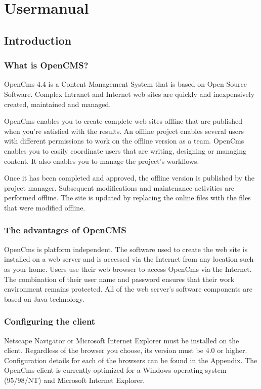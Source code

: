 \chapter{Usermanual}

\section{Introduction}

\subsection{What is OpenCMS?}

OpenCms 4.4 is a Content Management System that is based on Open
Source Software. Complex Intranet and Internet web sites are
quickly and inexpensively created, maintained and managed.

OpenCms enables you to create complete web sites offline that are
published when you're satisfied with the results. An offline
project enables several users with different permissions to work
on the offline version as a team. OpenCms enables you to easily
coordinate users that are writing, designing or managing content.
It also enables you to manage the project's workflows.

Once it has been completed and approved, the offline version is
published by the project manager. Subsequent modifications and
maintenance activities are performed offline. The site is updated
by replacing the online files with the files that were modified
offline.

\subsection{The advantages of OpenCMS}

OpenCms is platform independent. The software used to create the
web site is installed on a web server and is accessed via the
Internet from any location such as your home. Users use their web
browser to access OpenCms via the Internet. The combination of
their user name and password ensures that their work environment
remains protected. All of the web server's software components are
based on Java technology.

\subsection{Configuring the client}

Netscape Navigator or Microsoft Internet Explorer must be
installed on the client. Regardless of the browser you choose, its
version must be 4.0 or higher. Configuration details for each of
the browsers can be found in the Appendix. The OpenCms client is
currently optimized for a Windows operating system (95/98/NT) and
Microsoft Internet Explorer.

